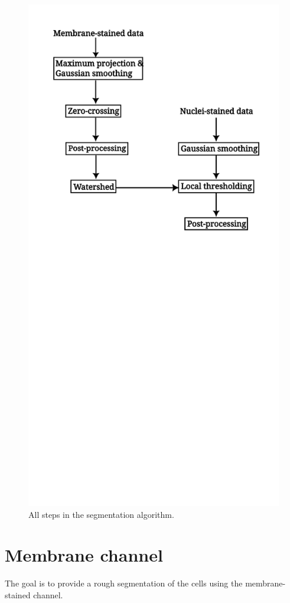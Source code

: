 \documentclass[
  digital,     %
  oneside,     %
  nosansbold,  %
  nocolorbold, %
  lof,         %
  lot,         %
]{fithesis4}
\begin{document}
\begin{figure}
    \begin{center}
        \includegraphics[width=0.8\linewidth]{./resources/inkscape/segmentation-steps.png}
    \end{center}
    \caption{All steps in the segmentation algorithm.}
    \label{fig:segmentation_steps}
\end{figure}

\section{Membrane channel}
The goal is to provide a rough segmentation of the cells using the
membrane-stained channel.
\end{document}
